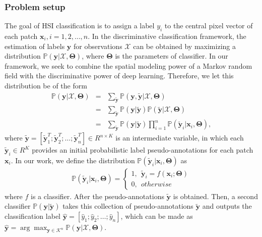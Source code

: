 \documentclass[journal]{IEEEtran}
\begin{document}
	\subsubsection{Problem setup} The goal of HSI classification is to assign a label $y_i$ to {{the central pixel vector of}} each patch $\mathbf{x}_i, i = 1,2,\dots,n$. In the discriminative classification framework, the estimation of labels $\mathbf{y}$ for observations $\mathbf{\mathcal{X}}$ can be obtained by maximizing a distribution $\mathbb{P}(\mathbf{y}|\mathbf{\mathcal{X}},\boldsymbol{\Theta})$, {{where $\boldsymbol{\Theta}$ is the parameters of classifier.}} In our framework, we seek to combine the spatial modeling power of a Markov random field with the discriminative power of deep learning. Therefore, we let this distribution be of the form 
	\begin{eqnarray}\label{model1}
	\mathbb{P}(\mathbf{y}|\mathbf{\mathcal{X}},\boldsymbol{\Theta}) 
	&=& \sum_{\widetilde{\mathbf{y}}} \mathbb{P}(\mathbf{y},\widetilde{\mathbf{y}}|\mathbf{\mathcal{X}},\boldsymbol{\Theta}) \nonumber\\
	&=& \sum_{\widetilde{\mathbf{y}}} \mathbb{P}(\mathbf{y}|\widetilde{\mathbf{y}})\mathbb{P}(\widetilde{\mathbf{y}}|\mathbf{\mathcal{X}},\boldsymbol{\Theta}) \nonumber\\
	&=& \sum_{\widetilde{\mathbf{y}}} \mathbb{P}(\mathbf{y}|\widetilde{\mathbf{y}})\prod_{i=1}^n \mathbb{P}(\widetilde{\mathbf{y}}_i|\mathbf{x}_{i},\boldsymbol{\Theta}),
	\end{eqnarray}
	where $\widetilde{\mathbf{y}}=[\widetilde{\mathbf{y}}_{1}^T;\widetilde{\mathbf{y}}_{2}^T;\dots;\widetilde{\mathbf{y}}_{n}^T]\in R^{n\times K}$ is an intermediate variable, in which each $\widetilde{\mathbf{y}}_{i}\in R^{K}$ provides an initial probabilistic label {{pseudo-annotations}} for each patch $\mathbf{x}_{i}$. {{In our work, we define the distribution $\mathbb{P}(\widetilde{\mathbf{y}}_i|\mathbf{x}_{i},\boldsymbol{\Theta})$ as
	\begin{eqnarray}
	\mathbb{P}(\widetilde{\mathbf{y}}_i|\mathbf{x}_{i},\boldsymbol{\Theta})=
	\begin{cases}
		1, ~~ \widetilde{\mathbf{y}}_i=f(\mathbf{x}_{i};\boldsymbol{\Theta})\\
		0, ~~ otherwise
	\end{cases}
	\end{eqnarray}
	where $f$ is a classifier. After the pseudo-annotations $\widetilde{\mathbf{y}}$ is obtained.}} Then, a second classifier $ \mathbb{P}(\mathbf{y}|\widetilde{\mathbf{y}})$ takes this collection of {{pseudo-annotations $\widetilde{\mathbf{y}}$}} and outputs the {{classification label}} $\widehat{\mathbf{y}}=[\widehat{y}_{1};\widehat{y}_{2};\dots;\widehat{y}_{n}]$, which can be made as $\widehat{\mathbf{y}} = \arg\max_{\mathbf{y}\in\mathcal{K}^{n}} \mathbb{P}(\mathbf{y}|\mathbf{\mathcal{X}},\boldsymbol{\Theta})$.
	
\end{document}
